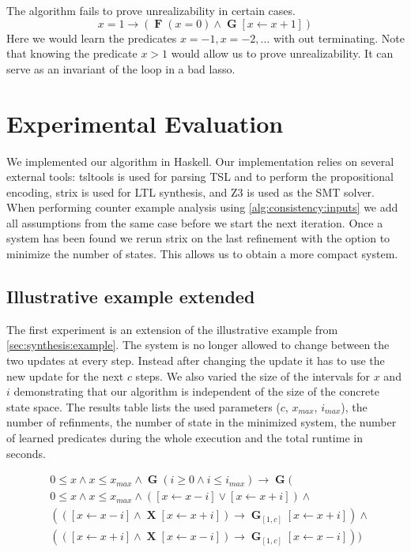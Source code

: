 \documentclass[runningheads]{llncs}
\newcommand{\eventually}{\operatorname{\mathbf{F}}}
\newcommand{\globally}{\operatorname{\mathbf{G}}}
\newcommand{\lnext}{\operatorname{\mathbf{X}}}
\newcommand{\rarrow}{\boldsymbol{\rightarrow}}
\begin{document}
The algorithm fails to prove unrealizability in certain cases.
$$
x=1 \rarrow (\eventually (x=0) \land \globally [x \leftarrow x+1])
$$
Here we would learn the predicates $x=-1, x=-2, \ldots$ with out terminating.
Note that knowing the predicate $x>1$ would allow us to prove unrealizability.
It can serve as an invariant of the loop in a bad lasso.




\section{Experimental Evaluation}
\label{sec:experiments}
We implemented our algorithm in Haskell.
Our implementation relies on several external tools: tsltools \cite{finkbeiner2019a} is used for parsing TSL and to perform the propositional encoding, strix \cite{meyer2018} is used for LTL synthesis, and Z3 \cite{demoura2008} is used as the SMT solver.
When performing counter example analysis using \cref{alg:consistency:inputs} we add all assumptions from the same case before we start the next iteration. Once a system has been found we rerun strix on the last refinement with the option to minimize the number of states. This allows us to obtain a more compact system.

\subsection{Illustrative example extended}
The first experiment is an extension of the illustrative example from \cref{sec:synthesis:example}.
The system is no longer allowed to change between the two updates at every step.
Instead after changing the update it has to use the new update for the next $c$ steps.
We also varied the size of the intervals for $x$ and $i$ demonstrating that our algorithm is independent of the size of the concrete state space. The results table lists the used parameters ($c$, $x_{max}$, $i_{max}$), the number of refinments, the number of state in the minimized system, the number of learned predicates during the whole execution and the total runtime in seconds.

\begin{align*}
&0 \leq x \land x \leq x_{max} \land \globally (i \geq 0 \land i \leq i_{max}) \rarrow \globally (\\
&0 \leq x \land x \leq x_{max} \land ([x \leftarrow x-i] \lor [x \leftarrow x+i]) \land\\
&(([x \leftarrow x-i] \land \lnext [x \leftarrow x+i]) \rightarrow \globally_{[1,c]} [x \leftarrow x+i]) \land\\
&(([x \leftarrow x+i] \land \lnext [x \leftarrow x-i]) \rightarrow \globally_{[1,c]} [x \leftarrow x-i]))
\end{align*}
\end{document}
